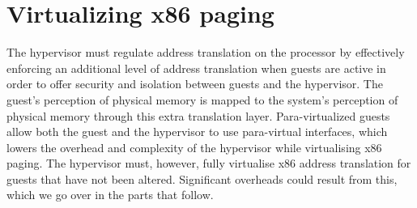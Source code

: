 \section{Virtualizing x86 paging}
The hypervisor must regulate address translation on the
processor by effectively enforcing an additional level of
address translation when guests are active in order to
offer security and isolation between guests and the
hypervisor. The guest's perception of physical memory is
mapped to the system's perception of physical memory
through this extra translation layer. Para-virtualized
guests allow both the guest and the hypervisor to use
para-virtual interfaces, which lowers the overhead and
complexity of the hypervisor while virtualising x86
paging. The hypervisor must, however, fully virtualise
x86 address translation for guests that have not been
altered. Significant overheads could result from this,
which we go over in the parts that follow. 

